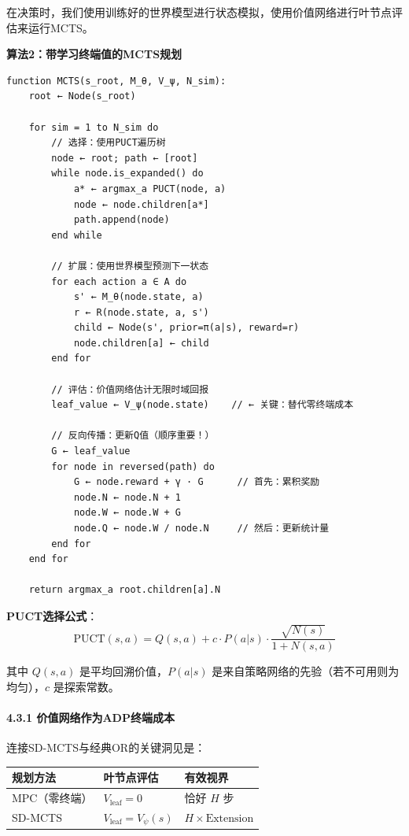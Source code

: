\documentclass[UTF8]{ctexart}
\let\oldparagraph\paragraph
\renewcommand{\paragraph}[1]{\oldparagraph{#1}\mbox{}}
\begin{document}
在决策时，我们使用训练好的世界模型进行状态模拟，使用价值网络进行叶节点评估来运行MCTS。

\textbf{算法2：带学习终端值的MCTS规划}

\begin{verbatim}
function MCTS(s_root, M_θ, V_ψ, N_sim):
    root ← Node(s_root)

    for sim = 1 to N_sim do
        // 选择：使用PUCT遍历树
        node ← root; path ← [root]
        while node.is_expanded() do
            a* ← argmax_a PUCT(node, a)
            node ← node.children[a*]
            path.append(node)
        end while

        // 扩展：使用世界模型预测下一状态
        for each action a ∈ A do
            s' ← M_θ(node.state, a)
            r ← R(node.state, a, s')
            child ← Node(s', prior=π(a|s), reward=r)
            node.children[a] ← child
        end for

        // 评估：价值网络估计无限时域回报
        leaf_value ← V_ψ(node.state)    // ← 关键：替代零终端成本

        // 反向传播：更新Q值（顺序重要！）
        G ← leaf_value
        for node in reversed(path) do
            G ← node.reward + γ · G      // 首先：累积奖励
            node.N ← node.N + 1
            node.W ← node.W + G
            node.Q ← node.W / node.N     // 然后：更新统计量
        end for
    end for

    return argmax_a root.children[a].N
\end{verbatim}

\textbf{PUCT选择公式}： \[
\text{PUCT}(s,a) = Q(s,a) + c \cdot P(a|s) \cdot \frac{\sqrt{N(s)}}{1 + N(s,a)}
\]

其中 \(Q(s,a)\) 是平均回溯价值，\(P(a|s)\)
是来自策略网络的先验（若不可用则为均匀），\(c\) 是探索常数。

\hypertarget{ux4ef7ux503cux7f51ux7edcux4f5cux4e3aadpux7ec8ux7aefux6210ux672c}{%
\paragraph{4.3.1
价值网络作为ADP终端成本}\label{ux4ef7ux503cux7f51ux7edcux4f5cux4e3aadpux7ec8ux7aefux6210ux672c}}

连接SD-MCTS与经典OR的关键洞见是：

\begin{table}[h]
\centering
\begin{tabular}{p{3cm}p{4cm}p{3cm}}
\toprule
\textbf{规划方法} & \textbf{叶节点评估} & \textbf{有效视界} \\
\midrule
MPC（零终端） & \(V_{\text{leaf}} = 0\) & 恰好 \(H\) 步 \\
SD-MCTS & \(V_{\text{leaf}} = V_\psi(s)\) & \(H \times \text{Extension}\) \\
\bottomrule
\end{tabular}
\end{table}
\end{document}
